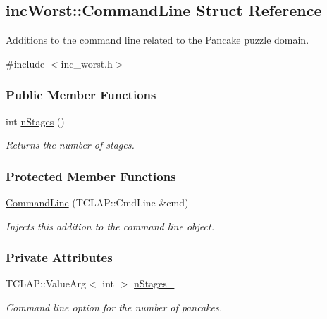 \hypertarget{structincWorst_1_1CommandLine}{}\subsection{inc\+Worst\+:\+:Command\+Line Struct Reference}
\label{structincWorst_1_1CommandLine}


Additions to the command line related to the Pancake puzzle domain.  




{\ttfamily \#include $<$inc\+\_\+worst.\+h$>$}

\subsubsection*{Public Member Functions}
\begin{DoxyCompactItemize}
\item 
int \hyperlink{structincWorst_1_1CommandLine_ae7d7f68454da32c575244bc212804c7c}{n\+Stages} ()
\begin{DoxyCompactList}\small\item\em Returns the number of stages. \end{DoxyCompactList}\end{DoxyCompactItemize}
\subsubsection*{Protected Member Functions}
\begin{DoxyCompactItemize}
\item 
\hyperlink{structincWorst_1_1CommandLine_aa1697922e17b339c650552ec4b510975}{Command\+Line} (T\+C\+L\+A\+P\+::\+Cmd\+Line \&cmd)
\begin{DoxyCompactList}\small\item\em Injects this addition to the command line object. \end{DoxyCompactList}\end{DoxyCompactItemize}
\subsubsection*{Private Attributes}
\begin{DoxyCompactItemize}
\item 
T\+C\+L\+A\+P\+::\+Value\+Arg$<$ int $>$ \hyperlink{structincWorst_1_1CommandLine_a9285d10b1a37107eff98720632a492ba}{n\+Stages\+\_\+}\hypertarget{structincWorst_1_1CommandLine_a9285d10b1a37107eff98720632a492ba}{}\label{structincWorst_1_1CommandLine_a9285d10b1a37107eff98720632a492ba}

\begin{DoxyCompactList}\small\item\em Command line option for the number of pancakes. \end{DoxyCompactList}\end{DoxyCompactItemize}


